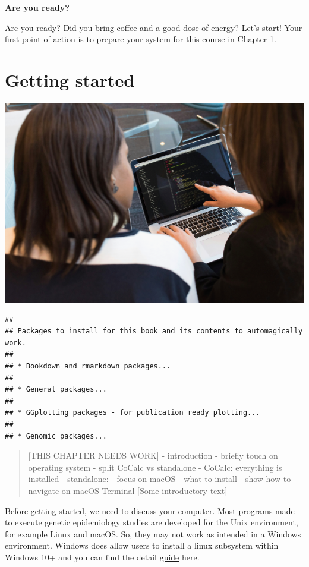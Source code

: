 \documentclass[
]{book}
\begin{document}
\textbf{Are you ready?}

Are you ready? Did you bring coffee and a good dose of energy? Let's start! Your first point of action is to prepare your system for this course in Chapter \ref{getting-started}.

\hypertarget{getting-started}{%
\chapter{Getting started}\label{getting-started}}

\includegraphics[width=1\textwidth,height=\textheight]{./img/_headers/women_behind_macbook.png}

\begin{lstlisting}
## 
## Packages to install for this book and its contents to automagically work.
## 
## * Bookdown and rmarkdown packages...
## 
## * General packages...
## 
## * GGplotting packages - for publication ready plotting...
## 
## * Genomic packages...
\end{lstlisting}

\begin{quote}
{[}THIS CHAPTER NEEDS WORK{]}
- introduction
- briefly touch on operating system
- split CoCalc vs standalone
- CoCalc: everything is installed
- standalone:
- focus on macOS
- what to install
- show how to navigate on macOS Terminal
{[}Some introductory text{]}
\end{quote}

Before getting started, we need to discuss your computer. Most programs made to execute genetic epidemiology studies are developed for the Unix environment, for example Linux and macOS. So, they may not work as intended in a Windows environment. Windows does allow users to install a linux subsystem within Windows 10+ and you can find the detail \href{https://docs.microsoft.com/en-us/windows/wsl/about}{guide} here.
\end{document}
